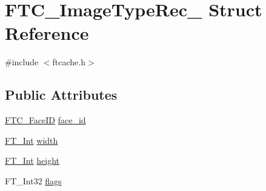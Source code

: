 \hypertarget{struct_f_t_c___image_type_rec__}{\section{F\-T\-C\-\_\-\-Image\-Type\-Rec\-\_\- Struct Reference}
\label{struct_f_t_c___image_type_rec__}
}


{\ttfamily \#include $<$ftcache.\-h$>$}

\subsection*{Public Attributes}
\begin{DoxyCompactItemize}
\item 
\hyperlink{ftcache_8h_a5da66c12c497bf5888638100876c7197}{F\-T\-C\-\_\-\-Face\-I\-D} \hyperlink{struct_f_t_c___image_type_rec___a9851b8d4a06baacd18d5b9856fd85abd}{face\-\_\-id}
\item 
\hyperlink{fttypes_8h_af90e5fb0d07e21be9fe6faa33f02484c}{F\-T\-\_\-\-Int} \hyperlink{struct_f_t_c___image_type_rec___af1a4cccbabb0f5852ed755a12ed08dd8}{width}
\item 
\hyperlink{fttypes_8h_af90e5fb0d07e21be9fe6faa33f02484c}{F\-T\-\_\-\-Int} \hyperlink{struct_f_t_c___image_type_rec___adb56a9d18a3f522d713d0ba01c1a8778}{height}
\item 
F\-T\-\_\-\-Int32 \hyperlink{struct_f_t_c___image_type_rec___a391782ed8c67de86591c71f276ea6454}{flags}
\end{DoxyCompactItemize}


